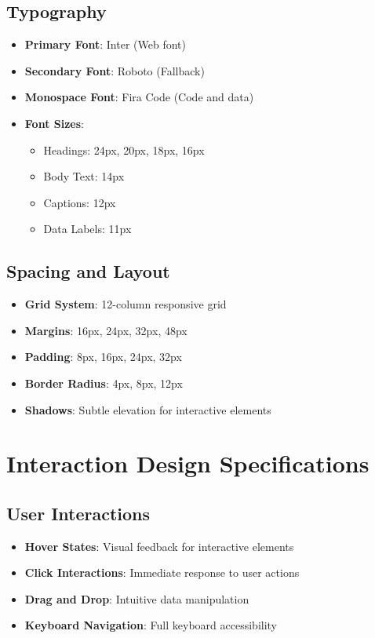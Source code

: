 \subsection{Typography}
\begin{itemize}
\item \textbf{Primary Font}: Inter (Web font)
\item \textbf{Secondary Font}: Roboto (Fallback)
\item \textbf{Monospace Font}: Fira Code (Code and data)
\item \textbf{Font Sizes}:
  \begin{itemize}
  \item Headings: 24px, 20px, 18px, 16px
  \item Body Text: 14px
  \item Captions: 12px
  \item Data Labels: 11px
  \end{itemize}
\end{itemize}

\subsection{Spacing and Layout}
\begin{itemize}
\item \textbf{Grid System}: 12-column responsive grid
\item \textbf{Margins}: 16px, 24px, 32px, 48px
\item \textbf{Padding}: 8px, 16px, 24px, 32px
\item \textbf{Border Radius}: 4px, 8px, 12px
\item \textbf{Shadows}: Subtle elevation for interactive elements
\end{itemize}


\section{Interaction Design Specifications}

\subsection{User Interactions}
\begin{itemize}
\item \textbf{Hover States}: Visual feedback for interactive elements
\item \textbf{Click Interactions}: Immediate response to user actions
\item \textbf{Drag and Drop}: Intuitive data manipulation
\item \textbf{Keyboard Navigation}: Full keyboard accessibility
\end{itemize}

